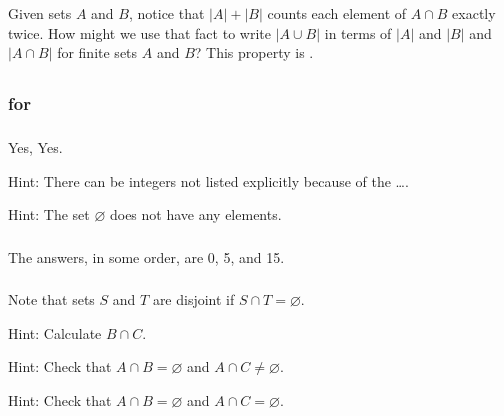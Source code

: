 \begin{exer}[\exerE] %
\label{exer_incl_excl}
    Given sets $A$ and $B$, notice that $|A|+|B|$ counts each element of $A \cap B$ exactly twice.  How might we use that fact to write $| A \cup B|$ in terms of $|A|$ and $|B|$ and $|A \cap B|$ for finite sets $A$ and $B$?  This property is .
\end{exer}

\subsection{\answers}
\subsubsection{\answers for 
\subelements}

\subsubsection*{ \answers}
\begin{apart}
    \item Yes, Yes.
    \item Hint: There can be integers not listed explicitly because of the \ldots. 
    \item Hint: The set $\varnothing$ does not have any elements.
\end{apart}

\subsubsection*{ \answers}
The answers, in some order, are 0, 5, and 15.

\subsubsection*{ \answers}
Note that sets $S$ and $T$ are disjoint if $S \cap T = \varnothing$.
\begin{apart}
    \item Hint: Calculate $B \cap C$.
    \item Hint: Check that $A \cap B = \varnothing$ and $A \cap C \neq \varnothing$.
    \item Hint: Check that $A \cap B = \varnothing$ and $A \cap C = \varnothing$.
\end{apart}

